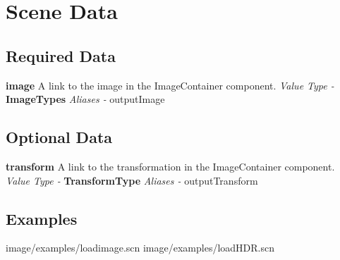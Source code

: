 \documentclass{article}
\newenvironment{componentoption}[1]%
{\textbf{#1}\newline}
{\newline}
\newcommand{\aliases}[1] {\newline \textit{Aliases - } #1}
\newcommand{\valuetype}[1] {\newline \textit{Value Type - } \textbf{#1}}
\begin{document}
\section{Scene Data}

\subsection{Required Data}

\begin{componentoption}{image}
A link to the image in the ImageContainer component.
\valuetype{ImageTypes}
\aliases{outputImage}
\end{componentoption}

\subsection{Optional Data}

\begin{componentoption}{transform}
A link to the transformation in the ImageContainer component.
\valuetype{TransformType}
\aliases{outputTransform}
\end{componentoption}

\subsection{Examples}
image/examples/loadimage.scn
image/examples/loadHDR.scn
\end{document}
